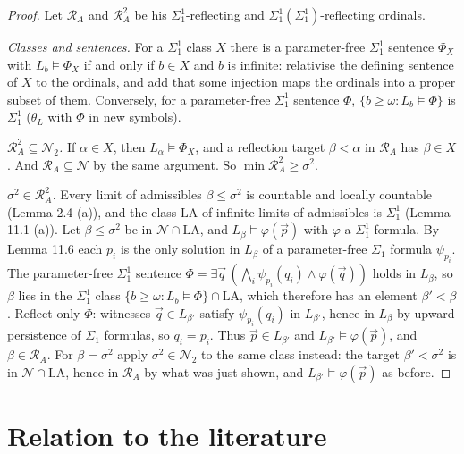 \documentclass[11pt]{article}
\begin{document}
\begin{proof} Let $\mathcal R_A$ and $\mathcal R^2_A$ be his $\Sigma^1_1$-reflecting and
$\Sigma^1_1(\Sigma^1_1)$-reflecting ordinals.

\emph{Classes and sentences.} For a $\Sigma^1_1$ class $X$ there is a parameter-free $\Sigma^1_1$ sentence $\Phi_X$
with $L_b \models \Phi_X$ if and only if $b \in X$ and $b$ is infinite: relativise the defining sentence of $X$ to
the ordinals, and add that some injection maps the ordinals into a proper subset of them. Conversely, for a
parameter-free $\Sigma^1_1$ sentence $\Phi$, $\{b \ge \omega : L_b \models \Phi\}$ is $\Sigma^1_1$ ($\theta_L$ with
$\Phi$ in new symbols).

\emph{$\mathcal R^2_A \subseteq \mathcal N_2$.} If $\alpha \in X$, then $L_{\alpha} \models \Phi_X$, and a
reflection target $\beta < \alpha$ in $\mathcal R_A$ has $\beta \in X$. And $\mathcal R_A \subseteq \mathcal N$ by
the same argument. So $\min \mathcal R^2_A \ge \sigma^2$.

\emph{$\sigma^2 \in \mathcal R^2_A$.} Every limit of admissibles $\beta \le \sigma^2$ is countable and locally
countable (Lemma 2.4 (a)), and the class $\mathrm{LA}$ of infinite limits of admissibles is $\Sigma^1_1$ (Lemma 11.1
(a)). Let $\beta \le \sigma^2$ be in $\mathcal N \cap \mathrm{LA}$, and $L_{\beta} \models \varphi(\vec p)$ with
$\varphi$ a $\Sigma^1_1$ formula. By Lemma 11.6 each $p_i$ is the only solution in $L_{\beta}$ of a parameter-free
$\Sigma_1$ formula $\psi_{p_i}$. The parameter-free $\Sigma^1_1$ sentence
$\Phi = \exists \vec q\, (\bigwedge_i \psi_{p_i}(q_i) \wedge \varphi(\vec q))$ holds in $L_{\beta}$, so $\beta$ lies
in the $\Sigma^1_1$ class $\{b \ge \omega : L_b \models \Phi\} \cap \mathrm{LA}$, which therefore has an element
$\beta' < \beta$. Reflect only $\Phi$: witnesses $\vec q \in L_{\beta'}$ satisfy $\psi_{p_i}(q_i)$ in $L_{\beta'}$,
hence in $L_{\beta}$ by upward persistence of $\Sigma_1$ formulas, so $q_i = p_i$. Thus $\vec p \in L_{\beta'}$ and
$L_{\beta'} \models \varphi(\vec p)$, and $\beta \in \mathcal R_A$. For $\beta = \sigma^2$ apply
$\sigma^2 \in \mathcal N_2$ to the same class instead: the target $\beta' < \sigma^2$ is in
$\mathcal N \cap \mathrm{LA}$, hence in $\mathcal R_A$ by what was just shown, and $L_{\beta'} \models \varphi(\vec p)$
as before.
\end{proof}

\section{Relation to the literature}
\end{document}
